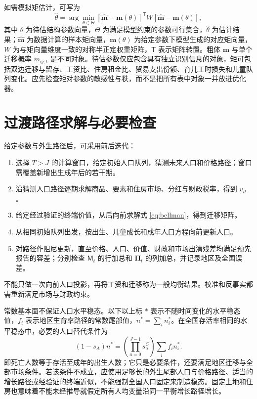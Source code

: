 \documentclass[UTF8,a4paper,zihao=-4,fontset=windows]{ctexart}
\numberwithin{equation}{section}
\begin{document}
如需模拟矩估计，可写为
\begin{equation}
  \widehat\theta=\arg\min_{\theta\in\Theta}
    [\widehat{\bm m}-\bm m(\theta)]^{\mathsf T}
      W[\widehat{\bm m}-\bm m(\theta)],
  \label{eq:smm}
\end{equation}
其中 $\theta$ 为待估结构参数向量，$\Theta$ 为满足模型约束的参数可行集合，$\widehat\theta$ 为估计结果；$\widehat{\bm m}$ 为数据计算的样本矩向量，$\bm m(\theta)$ 为给定参数下模型生成的对应矩向量，$W$ 为与矩向量维度一致的对称半正定权重矩阵，$\mathsf T$ 表示矩阵转置。粗体 $\bm m$ 与单个迁移概率 $m_{ij,t}$ 是不同对象。待估参数仅应包含具有独立识别信息的对象，矩可包括双边迁移与留存、工资比、住房租金比、贸易支出份额、育儿工时损失和儿童队列变化。应先检查矩对参数的敏感性与秩，而不是把所有表中对象一并放进优化器。

\section{过渡路径求解与必要检查}
\label{sec:solution}

给定参数与外生路径后，可采用前后迭代：
\begin{enumerate}
  \item 选择 $T>J$ 的计算窗口，给定初始人口队列，猜测未来人口和价格路径；窗口需覆盖新增出生成年后的若干期。
  \item 沿猜测人口路径逐期求解商品、要素和住房市场、分红与财政税率，得到 $v_{it}$。
  \item 给定经过验证的终端价值，从后向前求解式 \eqref{eq:bellman}，得到迁移矩阵。
  \item 从相同初始队列出发，按出生、儿童成长和成年人口方程向前更新人口。
  \item 对路径作阻尼更新，直至价格、人口、价值、财政和市场出清残差均满足预先报告的容差；分别检查 $\mathsf M_t$ 的行加总和 $\bm\Pi_t$ 的列加总，并记录地区及全国误差。
\end{enumerate}
不能只做一次向前人口投影，再将工资和迁移称为一般均衡结果。校准和反事实都需重新满足市场与财政约束。

常数基本面不保证人口水平稳态。以下以上标 $*$ 表示不随时间变化的水平稳态值，$f_i$ 表示地区生育率路径的常数尾部值，$n^*=\sum_in_i^*$。在全国存活率相同的水平稳态中，必要的人口替代条件为
\begin{equation}
  (1-s_A)n^*
    =\left(\prod_{a=0}^{J-1}s^C_a\right)
       \sum_i f_in_i^*.
  \label{eq:stationary-population}
\end{equation}
即死亡人数等于存活至成年的出生人数；它只是必要条件，还要满足地区迁移与全部市场条件。若该条件不成立，应使用足够长的外生尾部人口与价格路径、适当的增长路径或经验证的终端近似，不能强制全国人口固定来制造稳态。固定土地和住房也意味着不能未经推导就假定所有人均变量沿同一平衡增长路径增长。
\end{document}
